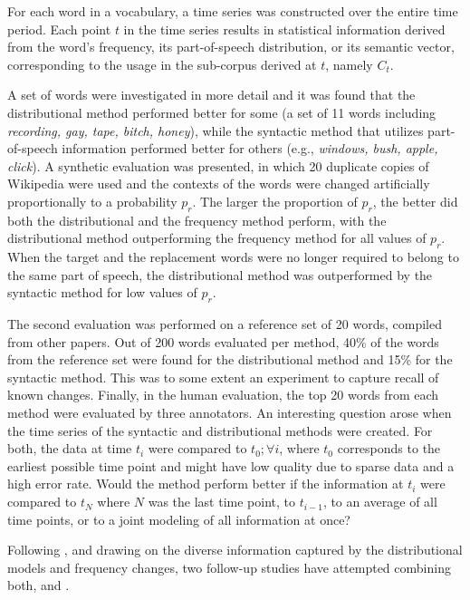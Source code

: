 \documentclass[output=paper]{langsci/langscibook}
\begin{document}
For each word in a vocabulary, a time series was constructed over the entire time period. Each point $t$ in the time series results in statistical information derived from the word's frequency, its part-of-speech distribution, or its semantic vector, corresponding to the usage in the sub-corpus derived at $t$, namely $C_t$. 

A set of words were investigated in more detail and it was found that the distributional method performed better for some (a set of 11 words including \emph{recording, gay, tape, bitch, honey}), while the syntactic method that utilizes part-of-speech information performed better for others (e.g., 
\emph{windows, bush, apple, click}). 
A synthetic evaluation was presented, in which 20 duplicate copies of Wikipedia were used 
and the contexts of the words were changed artificially proportionally to a probability $p_{r}$.
The larger the proportion of $p_{r}$, the better did both the distributional and the frequency method perform, with the distributional method outperforming the frequency method for all values of $p_{r}$.
When the target and the replacement words were no longer required to belong to the same part of speech, the distributional method was outperformed by the syntactic method for low values of $p_{r}$. 

The second evaluation was performed on a reference set of 20 words, compiled from other papers.  
Out of 200 words evaluated per method, 40\% of the words from the reference set were found for the distributional method and 15\% for the syntactic method. This was to some extent an experiment to capture recall of known changes.  
Finally, in the human evaluation, the top 20 words from each method were evaluated by three annotators.
An interesting question arose when the time series of the syntactic and distributional methods were created. For both, the data at time $t_i$ were compared to $t_0; \forall i$, where $t_0$ corresponds to the earliest possible time point and might have low quality due to sparse data and a high error rate. Would the method perform better if the information at $t_i$ were compared to $t_N$ where $N$ was the last time point, to $t_{i-1}$, to an average of all time points, or to a joint modeling of all information at once?

Following \citet{kulkarni2015statistically}, and drawing on the diverse information captured by the distributional models and frequency changes, two follow-up studies have attempted combining both, \citet{stewartabv17} and \citet{englhardt2020improving}.
\end{document}

